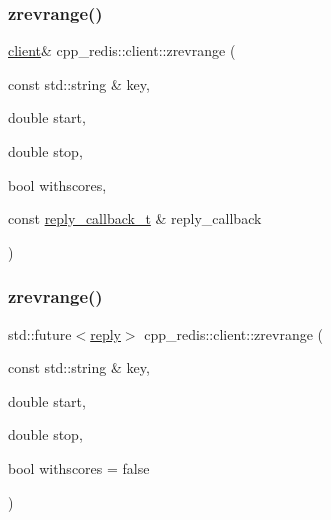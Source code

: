 \subsubsection{\texorpdfstring{zrevrange()}{zrevrange()}\hspace{0.1cm}{\footnotesize\ttfamily [5/9]}}
{\footnotesize\ttfamily \hyperlink{classcpp__redis_1_1client}{client}\& cpp\+\_\+redis\+::client\+::zrevrange (\begin{DoxyParamCaption}\item[{const std\+::string \&}]{key,  }\item[{double}]{start,  }\item[{double}]{stop,  }\item[{bool}]{withscores,  }\item[{const \hyperlink{classcpp__redis_1_1client_a061a1140d36d2eaeda82b09a0bb3f9f2}{reply\+\_\+callback\+\_\+t} \&}]{reply\+\_\+callback }\end{DoxyParamCaption})}

\mbox{\label{classcpp__redis_1_1client_a85aa18b29763edd1d93c4b463b6b3a51}} 
\subsubsection{\texorpdfstring{zrevrange()}{zrevrange()}\hspace{0.1cm}{\footnotesize\ttfamily [6/9]}}
{\footnotesize\ttfamily std\+::future$<$\hyperlink{classcpp__redis_1_1reply}{reply}$>$ cpp\+\_\+redis\+::client\+::zrevrange (\begin{DoxyParamCaption}\item[{const std\+::string \&}]{key,  }\item[{double}]{start,  }\item[{double}]{stop,  }\item[{bool}]{withscores = {\ttfamily false} }\end{DoxyParamCaption})}

\mbox{\label{classcpp__redis_1_1client_ab72a94b6f16cb23cf39275bfc9e35385}} 
